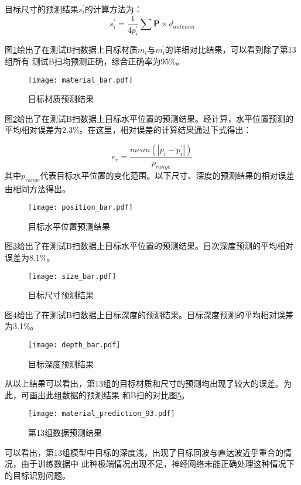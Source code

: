 目标尺寸的预测结果$s_i^{\prime}$的计算方法为：
\begin{equation}
	s_i^{\prime} = \frac{1}{4 p_i^{\prime}}\sum{\mathbf{P}}\times d_{antenna}
\end{equation}

图\ref{material_bar}绘出了在测试B扫数据上目标材质$m_i$与$m_i^{\prime}$的详细对比结果，可以看到除了第13组所有
测试B扫均预测正确，综合正确率为95\%。
\begin{figure}[htbp]
	\texttt{[image: material\_bar.pdf]}
	\caption[]{目标材质预测结果}
	\label{material_bar}
\end{figure}

图\ref{position_bar}给出了在测试B扫数据上目标水平位置的预测结果。经计算，水平位置预测的平均相对误差为2.3\%。在这里，相对误差的计算结果通过下式得出：

\begin{equation}
	e_r = \frac{mean(|p_i - p_i^{\prime}|)}{p_{range}}
\end{equation}
其中$p_{range}$代表目标水平位置的变化范围。以下尺寸、深度的预测结果的相对误差由相同方法得出。

\begin{figure}[htbp]		
	\texttt{[image: position\_bar.pdf]}
	\caption[]{目标水平位置预测结果}
	\label{position_bar}
\end{figure}

图\ref{size_bar}给出了在测试B扫数据上目标水平位置的预测结果。目次深度预测的平均相对误差为8.1\%。
\begin{figure}[htbp]
	\texttt{[image: size\_bar.pdf]}
	\caption[]{目标尺寸预测结果}
	\label{size_bar}
\end{figure}

图\ref{depth_bar}给出了在测试B扫数据上目标深度的预测结果。目标深度预测的平均相对误差为3.1\%。
\begin{figure}[H]
	\texttt{[image: depth\_bar.pdf]}
	\caption[]{目标深度预测结果}
	\label{depth_bar}
\end{figure}

从以上结果可以看出，第13组的目标材质和尺寸的预测均出现了较大的误差。为此，可画出此组数据的预测结果
和B扫的对比图\ref{group13}。
\begin{figure}[H]
	\texttt{[image: material\_prediction\_93.pdf]}
	\caption[]{第13组数据预测结果}
	\label{group13}
\end{figure}

可以看出，第13组模型中目标的深度浅，出现了目标回波与直达波近乎重合的情况，由于训练数据中
此种极端情况出现不足，神经网络未能正确处理这种情况下的目标识别问题。

